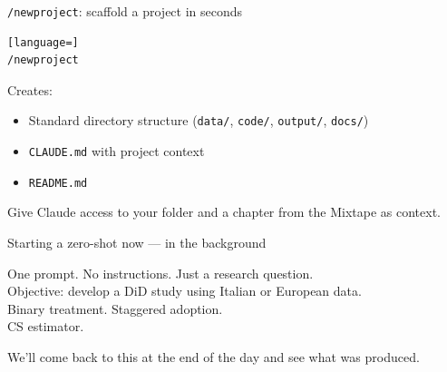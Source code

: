 \documentclass[aspectratio=169,11pt]{beamer}
\begin{document}
\begin{frame}[fragile]{\texttt{/newproject}: scaffold a project in seconds}
\vspace{0.4em}
\begin{lstlisting}[language=]
/newproject
\end{lstlisting}
\vspace{0.4em}
Creates:
\begin{itemize}\setlength\itemsep{0.3em}
  \item Standard directory structure (\texttt{data/}, \texttt{code/}, \texttt{output/}, \texttt{docs/})
  \item \texttt{CLAUDE.md} with project context
  \item \texttt{README.md}
\end{itemize}
\vspace{0.3em}
\begin{center}\color{warmgray}\small
Give Claude access to your folder and a chapter from the Mixtape as context.
\end{center}
\end{frame}


\begin{frame}{Starting a zero-shot now --- in the background}
\vspace{0.8em}
\begin{center}
\large
One prompt. No instructions. Just a research question.\\[0.8em]
\color{warmgray}\normalsize
Objective: develop a DiD study using Italian or European data.\\[0.4em]
Binary treatment. Staggered adoption.\\[0.4em]
CS estimator.
\end{center}
\vspace{0.5em}
\begin{center}\color{warmgray}\small
We'll come back to this at the end of the day and see what was produced.
\end{center}
\end{frame}

\end{document}

